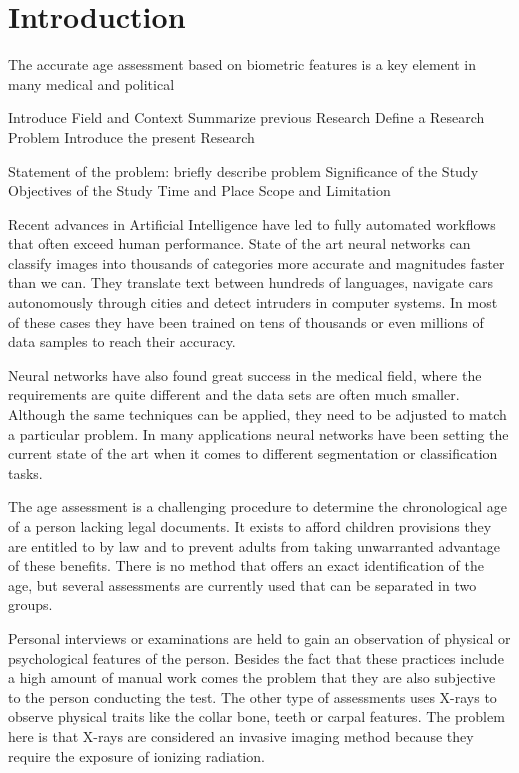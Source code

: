 \section{Introduction}

The accurate age assessment based on biometric features is a key element in many medical and political

Introduce Field and Context
Summarize previous Research
Define a Research Problem
Introduce the present Research

Statement of the problem: briefly describe problem
Significance of the Study
Objectives of the Study
Time and Place
Scope and Limitation

Recent advances in Artificial Intelligence have led to fully automated workflows that often exceed human performance. State of the art neural networks can classify images into thousands of categories more accurate and magnitudes faster than we can. They translate text between hundreds of languages, navigate cars autonomously through cities and detect intruders in computer systems. In most of these cases they have been trained on tens of thousands or even millions of data samples to reach their accuracy. 

Neural networks have also found great success in the medical field, where the requirements are quite different and the data sets are often much smaller. Although the same techniques can be applied, they need to be adjusted to match a particular problem. In many applications neural networks have been setting the current state of the art when it comes to different segmentation or classification tasks.

The age assessment is a challenging procedure to determine the chronological age of a person lacking legal documents. It exists to afford children provisions they are entitled to by law and to prevent adults from taking unwarranted advantage of these benefits. There is no method that offers an exact identification of the age, but several assessments are currently used that can be separated in two groups.

Personal interviews or examinations are held to gain an observation of physical or psychological features of the person. Besides the fact that these practices include a high amount of manual work comes the problem that they are also subjective to the person conducting the test. The other type of assessments uses X-rays to observe physical traits like the collar bone, teeth or carpal features. The problem here is that X-rays are considered an invasive imaging method because they require the exposure of ionizing radiation.

